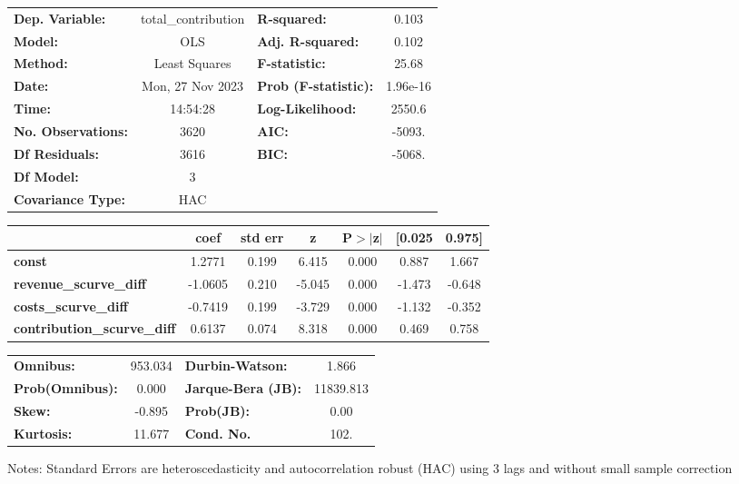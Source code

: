 \begin{center}
\begin{tabular}{lclc}
\toprule
\textbf{Dep. Variable:}             & total\_contribution & \textbf{  R-squared:         } &     0.103   \\
\textbf{Model:}                     &         OLS         & \textbf{  Adj. R-squared:    } &     0.102   \\
\textbf{Method:}                    &    Least Squares    & \textbf{  F-statistic:       } &     25.68   \\
\textbf{Date:}                      &   Mon, 27 Nov 2023  & \textbf{  Prob (F-statistic):} &  1.96e-16   \\
\textbf{Time:}                      &       14:54:28      & \textbf{  Log-Likelihood:    } &    2550.6   \\
\textbf{No. Observations:}          &          3620       & \textbf{  AIC:               } &    -5093.   \\
\textbf{Df Residuals:}              &          3616       & \textbf{  BIC:               } &    -5068.   \\
\textbf{Df Model:}                  &             3       & \textbf{                     } &             \\
\textbf{Covariance Type:}           &         HAC         & \textbf{                     } &             \\
\bottomrule
\end{tabular}
\begin{tabular}{lcccccc}
                                    & \textbf{coef} & \textbf{std err} & \textbf{z} & \textbf{P$> |$z$|$} & \textbf{[0.025} & \textbf{0.975]}  \\
\midrule
\textbf{const}                      &       1.2771  &        0.199     &     6.415  &         0.000        &        0.887    &        1.667     \\
\textbf{revenue\_scurve\_diff}      &      -1.0605  &        0.210     &    -5.045  &         0.000        &       -1.473    &       -0.648     \\
\textbf{costs\_scurve\_diff}        &      -0.7419  &        0.199     &    -3.729  &         0.000        &       -1.132    &       -0.352     \\
\textbf{contribution\_scurve\_diff} &       0.6137  &        0.074     &     8.318  &         0.000        &        0.469    &        0.758     \\
\bottomrule
\end{tabular}
\begin{tabular}{lclc}
\textbf{Omnibus:}       & 953.034 & \textbf{  Durbin-Watson:     } &     1.866  \\
\textbf{Prob(Omnibus):} &   0.000 & \textbf{  Jarque-Bera (JB):  } & 11839.813  \\
\textbf{Skew:}          &  -0.895 & \textbf{  Prob(JB):          } &      0.00  \\
\textbf{Kurtosis:}      &  11.677 & \textbf{  Cond. No.          } &      102.  \\
\bottomrule
\end{tabular}
\end{center}

Notes: \newline
 [1] Standard Errors are heteroscedasticity and autocorrelation robust (HAC) using 3 lags and without small sample correction